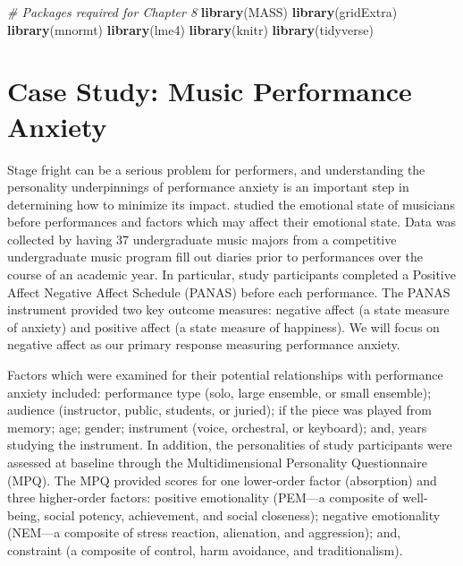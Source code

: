 \documentclass[
]{krantz}
\newenvironment{Shaded}{\begin{snugshade}}{\end{snugshade}}
\newcommand{\CommentTok}[1]{\textcolor[rgb]{0.37,0.37,0.37}{\textit{#1}}}
\newcommand{\KeywordTok}[1]{\textcolor[rgb]{0.27,0.27,0.27}{\textbf{#1}}}
\newcommand{\NormalTok}[1]{#1}
\begin{document}
\begin{Shaded}
\begin{Highlighting}[]
\CommentTok{# Packages required for Chapter 8}
\KeywordTok{library}\NormalTok{(MASS)}
\KeywordTok{library}\NormalTok{(gridExtra)  }
\KeywordTok{library}\NormalTok{(mnormt) }
\KeywordTok{library}\NormalTok{(lme4) }
\KeywordTok{library}\NormalTok{(knitr) }
\KeywordTok{library}\NormalTok{(tidyverse)}
\end{Highlighting}
\end{Shaded}

\hypertarget{cs:music}{%
\section{Case Study: Music Performance Anxiety}\label{cs:music}}

Stage fright can be a serious problem for performers, and understanding the personality underpinnings of performance anxiety is an important step in determining how to minimize its impact. \citet{Miller2010} studied the emotional state of musicians before performances and factors which may affect their emotional state. Data was collected by having 37 undergraduate music majors from a competitive undergraduate music program fill out diaries prior to performances over the course of an academic year. In particular, study participants completed a Positive Affect Negative Affect Schedule (PANAS) before each performance. The PANAS instrument provided two key outcome measures: negative affect (a state measure of anxiety) and positive affect (a state measure of happiness). We will focus on negative affect as our primary response measuring performance anxiety.

Factors which were examined for their potential relationships with performance anxiety included: performance type (solo, large ensemble, or small ensemble); audience (instructor, public, students, or juried); if the piece was played from memory; age; gender; instrument (voice, orchestral, or keyboard); and, years studying the instrument. In addition, the personalities of study participants were assessed at baseline through the Multidimensional Personality Questionnaire (MPQ). The MPQ provided scores for one lower-order factor (absorption) and three higher-order factors: positive emotionality (PEM---a composite of well-being, social potency, achievement, and social closeness); negative emotionality (NEM---a composite of stress reaction, alienation, and aggression); and, constraint (a composite of control, harm avoidance, and traditionalism).
\end{document}
